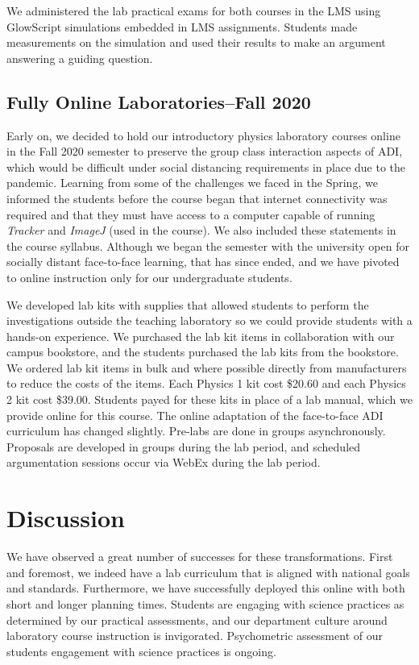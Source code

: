 \documentclass[aip, numerical, preprint]{revtex4-2}
\begin{document}
We administered the lab practical exams for both courses in the LMS using GlowScript simulations
embedded in LMS assignments. Students made measurements on the simulation and used their
results to make an argument answering a guiding question.

\subsection{Fully Online Laboratories--Fall 2020}

Early on, we decided to hold our introductory physics laboratory courses online in the Fall
2020 semester to preserve the group class interaction aspects of ADI, which would be
difficult under social distancing requirements in place due to the
pandemic.\citep{mclber20} Learning from some of the challenges we faced in the Spring, we
informed the students before the course began that internet connectivity was required and that
they must have access to a computer capable of running \emph{Tracker}\citep{bro2009} and \emph{ImageJ}\citep{schrasetal12} (used in the course). We also included these statements in the course
syllabus. Although we began the semester with the university open for socially distant
face-to-face learning, that has since ended, and we have pivoted to online instruction only for
our undergraduate students.

We developed lab kits with supplies that allowed students to perform the investigations outside the teaching
laboratory so we could provide students with a hands-on experience. We purchased the lab kit items in collaboration with our campus bookstore, and the
students purchased the lab kits from the bookstore. We ordered lab kit items in bulk and where
possible directly from manufacturers to reduce the costs of the items. Each Physics 1
kit cost \$20.60 and each Physics 2
kit cost \$39.00. Students payed for these kits in place of a lab
manual, which we provide online for this course.  The online adaptation of the face-to-face ADI
curriculum has changed slightly. Pre-labs are done in groups asynchronously.
Proposals are developed in groups during the lab period, and scheduled argumentation sessions occur via WebEx during the lab period.

\section{Discussion}
We have observed a great number of successes for these transformations.  First and foremost, we indeed have a lab curriculum that is aligned with national goals and
standards. Furthermore, we have successfully deployed this online with both short and longer
planning times.  Students are engaging with science practices as determined by our
practical assessments, and our department culture around laboratory course instruction is
invigorated. Psychometric assessment of our students engagement with science practices is
ongoing.
\end{document}
